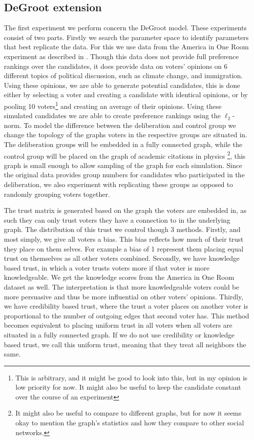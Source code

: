 \subsection{DeGroot extension}

The first experiment we perform concern the DeGroot model. These experiments
consist of two parts. Firstly we search the parameter space to identify
parameters that best replicate the data. For this we use data from the
America in One Room experiment as described in .
Though this data does not provide full preference rankings over the
candidates, it does provide data on voters' opinions on 6 different topics
of political discussion, such as climate change, and immigration. Using
these opinions, we are able to generate potential candidates, this is done
either by selecting a voter and creating a candidate with identical
opinions, or by pooling 10 voters\footnote{This is arbitrary, and it might
	be good to look into this, but in my opinion is low priority
	for now. It might also be useful to keep the candidate constant over the
	course of an experiment} and creating an average of their opinions. Using
these simulated candidates we are able to create preference rankings using
the $\ell_2$-norm. To model the difference between the deliberation and
control group we change the topology of the graphs voters in the respective
groups are situated in. The deliberation groups will be embedded in a fully
connected graph, while the control group will be placed on the graph of
academic citations in physics \cite{nr}\footnote{It might also be useful to
	compare to different graphs, but for now it seems okay to mention the graph's
	statistics and how they compare to other social networks.}, this graph is
small enough to allow
sampling of the graph for each simulation. Since the original data provides group numbers for candidates who participated in the deliberation, we also experiment with replicating these groups as opposed to randomly grouping voters together.

The trust matrix is generated based on the graph the voters are embedded in, as such they can only trust voters they have a connection to in the underlying graph. The distribution of this trust we control though 3 methods. Firstly, and most simply, we give all voters a bias. This bias reflects how much of their trust they place on them selves. For example a bias of 1 represent them placing equal trust on themselves as all other voters combined. Secondly, we have knowledge based trust, in which a voter trusts voters more if that voter is more knowledgeable. We get the knowledge scores from the America in One Room dataset as well. The interpretation is that more knowledgeable voters could be more persuasive and thus be more influential on other voters' opinions. Thirdly, we have credibility based trust, where the trust a voter places on another voter is proportional to the number of outgoing edges that second voter has. This method becomes equivalent to placing uniform trust in all voters when all voters are situated in a fully connected graph. If we do not use credibility or knowledge based trust, we call this uniform trust, meaning that they treat all neighbors the same.

